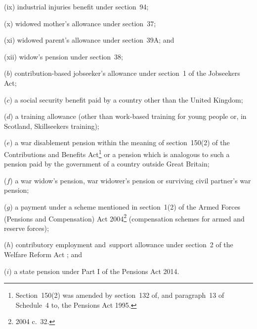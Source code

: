 \documentclass[12pt,a4paper]{article}
\begin{document}
\begin{enumerate}
\begin{enumerate}
(ix) industrial injuries benefit under section~94;

(x) widowed mother’s allowance under section~37;

(xi) widowed parent’s allowance under section~39A; and

(xii) widow’s pension under section~38;
\end{enumerate}

($b$) contribution-based jobseeker’s allowance under section~1 of the Jobseekers Act;

($c$) a social security benefit paid by a country other than the United Kingdom;

($d$) a training allowance (other than work-based training for young people or, in Scotland, Skillseekers training); 

($e$) a war disablement pension 
within the meaning of section~150(2) of the Contributions and Benefits Act\footnote{Section~150(2) was amended by section~132 of, and paragraph~13 of Schedule~4 to, the Pensions Act 1995.} or a pension which is analogous to such a pension paid by the government of a country outside Great Britain;


($f$) a war widow’s pension, war widower’s pension or surviving civil partner’s war pension;
%

($g$) a payment under a scheme mentioned in section~1(2) of the Armed Forces (Pensions and Compensation) Act 2004\footnote{2004 c.\ 32.} (compensation schemes for armed and reserve forces);
%

($h$) contributory employment and~support allowance under section~2 of the Welfare Reform Act
%
; and

($i$) a state pension under Part I of the Pensions Act 2014.
\end{enumerate}
\end{document}
